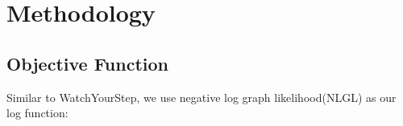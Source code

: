\documentclass{article}
\begin{document}

\section{Methodology}


\subsection{Objective Function}
Similar to WatchYourStep, we use negative log graph likelihood(NLGL) as our log function:
\end{document}
